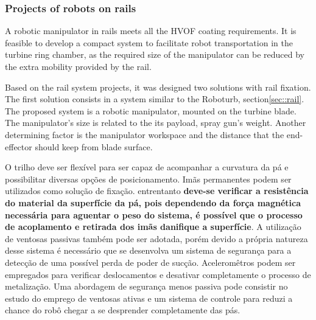 \subsubsection{Projects of robots on rails}\label{proj_rail}
A robotic manipulator in rails meets all the HVOF coating requirements. It is
feasible to develop a compact system to facilitate robot
transportation in the turbine ring chamber, as the required size of the
manipulator can be reduced by the extra mobility provided by the rail.

Based on the rail system projects, it was designed two solutions with rail
fixation. The first solution consists in a system similar to the Roboturb,
section\ref{sec::rail}. The proposed system is a robotic manipulator, mounted
on the turbine blade. The manipulator's size is related to the its payload,
spray gun's weight. Another determining factor is the manipulator workspace and
the distance that the end-effector should keep from blade surface.

O trilho deve ser flexível para ser capaz de acompanhar a curvatura da pá e
possibilitar diversas opções de posicionamento. Imãs permanentes podem ser
utilizados como solução de fixação. entrentanto \textbf{deve-se verificar a
resistência do material da superfície da pá, pois dependendo da força magnética
necessária para aguentar o peso do sistema, é possível que o processo de
acoplamento e retirada dos imãs danifique a superfície}. A utilização de
ventosas passivas também pode ser adotada, porém devido a própria natureza desse
sistema é necessário que se desenvolva um sistema de segurança para a detecção
de uma possível perda de poder de sucção. Aceleromêtros podem ser empregados
para verificar deslocamentos e desativar completamente o processo de
metalização. Uma abordagem de segurança menos passiva pode consistir no estudo
do emprego de ventosas ativas e um sistema de controle para reduzi a chance do
robô chegar a se desprender completamente das pás.

